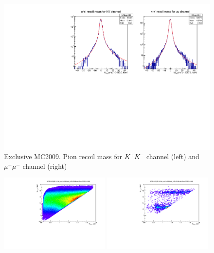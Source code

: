 \documentclass[a4paper,12pt]{article}
\newcommand{\uu}{\mu^{+}\mu^{-}}
\newcommand{\KK}{K^{+}K^{-}}
\begin{document}
\begin{figure}
\begin{center}
  \includegraphics[width=\textwidth]{fig/mcKKuu-Mrec90MeV.pdf}
  \caption{Exclusive MC2009. Pion recoil mass for $\KK$ channel (left) and $\uu$ channel (right)}
  \label{fig:mcexcl09-Mrec}
\end{center}
\end{figure}

\begin{figure}
\begin{center}
  \includegraphics[width=0.49\textwidth]{fig/dalitz-KK2.pdf}
  \hfill
  \includegraphics[width=0.49\textwidth]{fig/dalitz-bg2.pdf}
  \caption{}
\end{center}
\end{figure}
\end{document}
